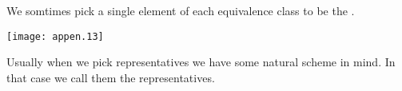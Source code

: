 We somtimes pick a single element of each equivalence class to be the 
.%
\begin{center}
  \texttt{[image: appen.13]}
%
%
%
%
\end{center}
Usually when we pick representatives we have some natural scheme in mind.
In that case we call them the
 representatives.%
%
%
 
